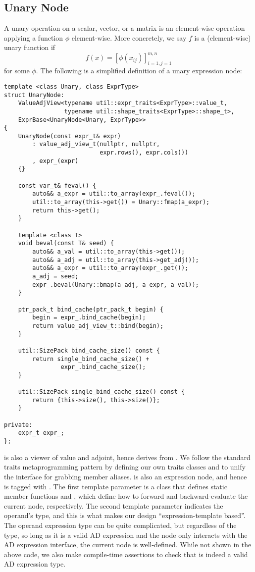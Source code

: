 \subsection{Unary Node}\label{ssec:unary}

A unary operation on a scalar, vector, or a matrix is an element-wise 
operation applying a function $\phi$ element-wise.
More concretely, we say $f$ is a (element-wise) unary function if
\[
    f(x) = {[\phi(x_{ij})]}_{i=1,j=1}^{m,n}
\]
for some $\phi$.
The following is a simplified definition of a unary expression node:
\begin{lstlisting}[style=customcpp]
template <class Unary, class ExprType>
struct UnaryNode:
    ValueAdjView<typename util::expr_traits<ExprType>::value_t,
                 typename util::shape_traits<ExprType>::shape_t>,
    ExprBase<UnaryNode<Unary, ExprType>>
{
    UnaryNode(const expr_t& expr)
        : value_adj_view_t(nullptr, nullptr, 
                           expr.rows(), expr.cols())
        , expr_(expr)
    {}

    const var_t& feval() {
        auto&& a_expr = util::to_array(expr_.feval());
        util::to_array(this->get()) = Unary::fmap(a_expr);
        return this->get();
    }

    template <class T>
    void beval(const T& seed) {
        auto&& a_val = util::to_array(this->get());
        auto&& a_adj = util::to_array(this->get_adj());
        auto&& a_expr = util::to_array(expr_.get());
        a_adj = seed;
        expr_.beval(Unary::bmap(a_adj, a_expr, a_val));
    }

    ptr_pack_t bind_cache(ptr_pack_t begin) { 
        begin = expr_.bind_cache(begin);
        return value_adj_view_t::bind(begin);
    }

    util::SizePack bind_cache_size() const { 
        return single_bind_cache_size() + 
                expr_.bind_cache_size();
    }

    util::SizePack single_bind_cache_size() const {
        return {this->size(), this->size()};
    }

private:
    expr_t expr_;
};
\end{lstlisting}

 is also a viewer of value and adjoint,
hence derives from .
We follow the standard traits metaprogramming pattern by defining our own
traits classes  and  to unify the interface
for grabbing member aliases.
 is also an expression node, and hence is tagged with .
The first template parameter  is a class that defines
static member functions  and ,
which define how to forward and backward-evaluate the current node, respectively.
The second template parameter indicates the operand's type,
and this is what makes our design ``expression-template based''.
The operand expression type can be quite complicated, but regardless of the type,
so long as it is a valid AD expression and 
the node only interacts with the AD expression interface, the current node is well-defined.
While not shown in the above code, we also make compile-time assertions
to check that  is indeed a valid AD expression type.

